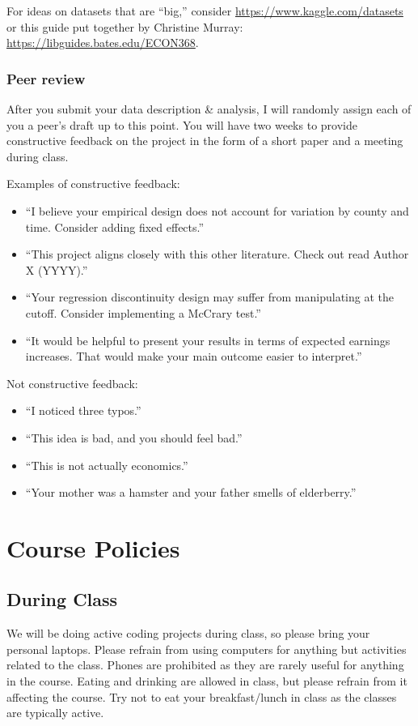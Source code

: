 \documentclass[11pt]{article}
\begin{document}
For ideas on datasets that are ``big,'' consider \url{https://www.kaggle.com/datasets} or this guide put together by Christine Murray: \url{https://libguides.bates.edu/ECON368}. 

\subsubsection*{Peer review}
After you submit your data description \& analysis, I will randomly assign each of you a peer's draft up to this point. You will have two weeks to provide constructive feedback on the project in the form of a short paper and a meeting during class. 

Examples of constructive feedback:
\begin{itemize}
  \item ``I believe your empirical design does not account for variation by county and time. Consider adding fixed effects.''
  \item ``This project aligns closely with this other literature. Check out read Author X (YYYY).''
  \item ``Your regression discontinuity design may suffer from manipulating at the cutoff. Consider implementing a McCrary test.''
  \item ``It would be helpful to present your results in terms of expected earnings increases. That would make your main outcome easier to interpret.''
\end{itemize}

Not constructive feedback:
\begin{itemize}
  \item ``I noticed three typos.''
  \item ``This idea is bad, and you should feel bad.''
  \item ``This is not actually economics.''
  \item ``Your mother was a hamster and your father smells of elderberry.''
\end{itemize}

\newpage
\section*{Course Policies}

\subsection*{During Class}
\footnotesize{We will be doing active coding projects during class, so please bring your personal laptops. Please refrain from using computers for anything but activities related to the class. Phones are prohibited as they are rarely useful for anything in the course. Eating and drinking are allowed in class, but please refrain from it affecting the course. Try not to eat your breakfast/lunch in class as the classes are typically active.}
\end{document}
